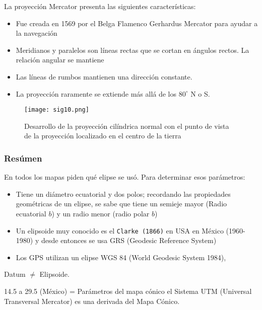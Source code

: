 La proyección Mercator presenta las siguientes características: 
\begin{itemize}
    \item Fue creada en 1569 por el Belga Flamenco Gerhardus Mercator  para ayudar a la navegación
    \item Meridianos y paralelos son líneas rectas que se cortan en ángulos rectos. La relación angular se mantiene
    \item Las líneas de rumbos mantienen una dirección constante.
    \item La proyección raramente se extiende más allá de los $80^{\circ}$ N o S.
\end{itemize}
\begin{figure}[h!]
\centering
  \texttt{[image: sig10.png]}
  \caption{Desarrollo de la proyección cilíndrica normal con el punto de vista de la proyección localizado en el centro de la tierra}
  \label{sig10}
\end{figure}
\subsubsection{Resúmen}
En todos los mapas piden qué elipse se usó.
Para determinar esos parámetros:
\begin{itemize}
    \item Tiene un diámetro ecuatorial y dos polos; recordando las propiedades geométricas de un elipse, se sabe que tiene un semieje mayor (Radio ecuatorial $b$) y un radio menor (radio polar $b$)
    \item Un elipsoide muy conocido es el \texttt{Clarke (1866)} en USA en México (1960-1980) y desde entonces se usa GRS (Geodesic Reference System)
    \item Los GPS utilizan un elipse WGS 84 (World Geodesic System 1984),
\end{itemize}
Datum $\neq$ Elipsoide.

14.5 a 29.5 (México) = Parámetros del mapa cónico el Sistema UTM (Universal Transversal Mercator) es una derivada del Mapa Cónico.

